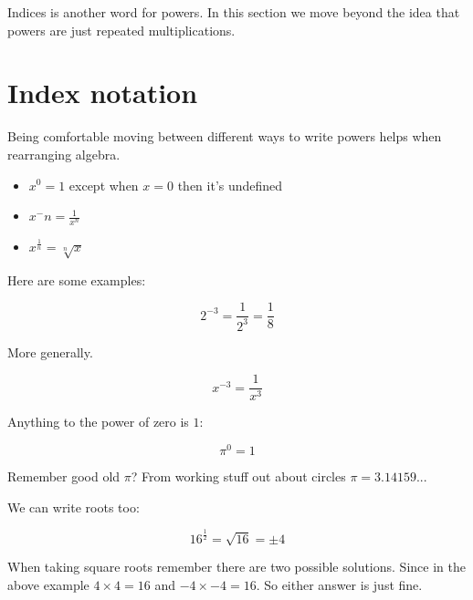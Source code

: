 \documentclass[
  a4paper,
]{scrbook}
\providecommand{\tightlist}{%
  \setlength{\itemsep}{0pt}\setlength{\parskip}{0pt}}\usepackage{longtable,booktabs,array}
\begin{document}
Indices is another word for powers. In this section we move beyond the
idea that powers are just repeated multiplications.

\hypertarget{index-notation}{%
\section{Index notation}\label{index-notation}}

Being comfortable moving between different ways to write powers helps
when rearranging algebra.

\begin{tcolorbox}[enhanced jigsaw, opacityback=0, left=2mm, toptitle=1mm, title=\textcolor{quarto-callout-note-color}{\faInfo}\hspace{0.5em}{Note}, breakable, colbacktitle=quarto-callout-note-color!10!white, opacitybacktitle=0.6, bottomtitle=1mm, arc=.35mm, colback=white, leftrule=.75mm, bottomrule=.15mm, colframe=quarto-callout-note-color-frame, rightrule=.15mm, titlerule=0mm, toprule=.15mm, coltitle=black]

\begin{itemize}
\tightlist
\item
  \(x^0 = 1\) except when \(x=0\) then it's undefined
\item
  \(x^-n = \frac{1}{x^n}\)
\item
  \(x^{\frac{1}{n}} = \sqrt[n]x\)
\end{itemize}

\end{tcolorbox}

Here are some examples:

\[
2^{-3} = \frac{1}{2^3} = \frac{1}{8}
\]

More generally.

\[
x^{-3} = \frac{1}{x^3}
\]

Anything to the power of zero is \(1\):

\[
\pi^0 = 1
\]

Remember good old \(\pi\)? From working stuff out about circles
\(\pi = 3.14159...\)

We can write roots too:

\[
16^{\frac{1}{2}} = \sqrt{16} = \pm4
\]

\begin{tcolorbox}[enhanced jigsaw, opacityback=0, left=2mm, toptitle=1mm, title=\textcolor{quarto-callout-tip-color}{\faLightbulb}\hspace{0.5em}{Pro tip}, breakable, colbacktitle=quarto-callout-tip-color!10!white, opacitybacktitle=0.6, bottomtitle=1mm, arc=.35mm, colback=white, leftrule=.75mm, bottomrule=.15mm, colframe=quarto-callout-tip-color-frame, rightrule=.15mm, titlerule=0mm, toprule=.15mm, coltitle=black]
When taking square roots remember there are two possible solutions.
Since in the above example \(4 \times 4 = 16\) and
\(-4 \times -4 = 16\). So either answer is just fine.
\end{tcolorbox}
\end{document}
